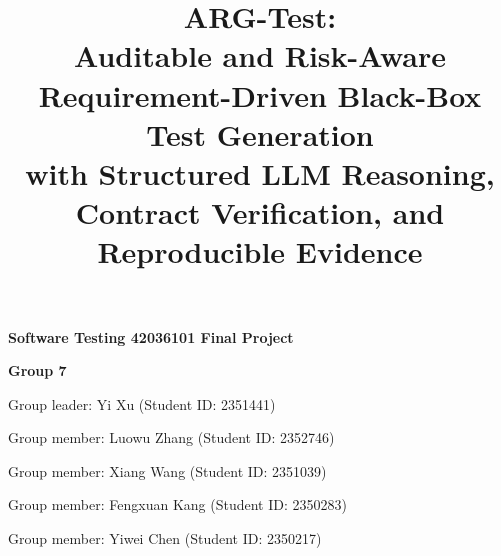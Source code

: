 \documentclass{article}
\title{ARG-Test:\\
Auditable and Risk-Aware Requirement-Driven Black-Box Test Generation\\
with Structured LLM Reasoning, Contract Verification, and Reproducible Evidence}
\author{}
\begin{document}
\pagestyle{plain}
\begin{titlepage}
\thispagestyle{plain}
\centering
\vspace*{\fill}
{\LARGE\bf Software Testing 42036101 Final Project\par}
\vspace{0.55in}
{\Large\bf Group 7\par}
\vspace{0.75in}
{\large Group leader: Yi Xu (Student ID: 2351441)\par}
\vspace{0.18in}
{\large Group member: Luowu Zhang (Student ID: 2352746)\par}
\vspace{0.18in}
{\large Group member: Xiang Wang (Student ID: 2351039)\par}
\vspace{0.18in}
{\large Group member: Fengxuan Kang (Student ID: 2350283)\par}
\vspace{0.18in}
{\large Group member: Yiwei Chen (Student ID: 2350217)\par}
\vspace*{\fill}
\end{titlepage}
\clearpage
\setcounter{page}{2}
\maketitle
\end{document}
